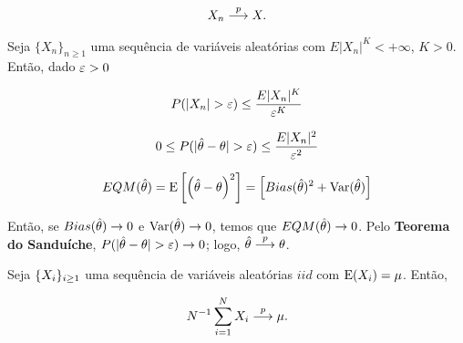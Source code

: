 \documentclass[11pt, oneside, a4paper, article]{article}
\numberwithin{equation}{section}
\begin{document}
\begin{description}
\begin{description}
\begin{def1}
\vspace{-1 em}
\begin{align*}
	X_{n}  \overset{p}{\longrightarrow}  X.
\end{align*}
\end{def1}

\begin{def1}
Seja
$\{ X_{n} \}_{n \geq 1}$ 
uma sequência de variáveis aleatórias com
$E|X_{n}|^{K} < +\infty$, $K>0$. 
Então, dado $\varepsilon >0$

\vspace{-1 em}
\begin{align*}
	P(| X_{n} | > \varepsilon ) \leq \frac{E|X_{n}|^{K}}{\varepsilon^{K}}
\end{align*}
\end{def1}

\begin{def1} %
\begin{align*}
0 \leq P(| \hat{\theta} - \theta | > \varepsilon ) \leq \frac{E|X_{n}|^{2}}{\varepsilon^{2}}
\end{align*}
\end{def1}

\begin{def1}
\begin{align*}
EQM(\hat{\theta}) 
=
\text{E}\left[ \left( \hat{\theta} - \theta \right)^2 \right] 
=
\left[ Bias(\hat{\theta})^{2} + \text{Var}(\hat{\theta}) \right]
\end{align*}
\end{def1}

Então, se $Bias(\hat{\theta}) \to 0$ e $\text{Var}(\hat{\theta}) \to 0$, temos que $EQM(\hat{\theta}) \to 0$.
Pelo \textbf{Teorema do Sanduíche}, $P(|\hat{\theta} - \theta| > \varepsilon) \to 0$; logo, $\hat{\theta}  \overset{p}{\longrightarrow}  \theta$.

\begin{def1}
Seja $\{X_{i}\}_{i \geq 1}$ uma sequência de variáveis aleatórias $iid$ com $\text{E}(X_{i}) = \mu$.
Então, 

\vspace{-1 em}
\begin{align*}
	N^{-1} \sum_{i=1}^{N} X_{i}  \overset{p}{\longrightarrow}  \mu.
\end{align*}
\end{def1}


\end{description}
\end{description}
\end{document}
